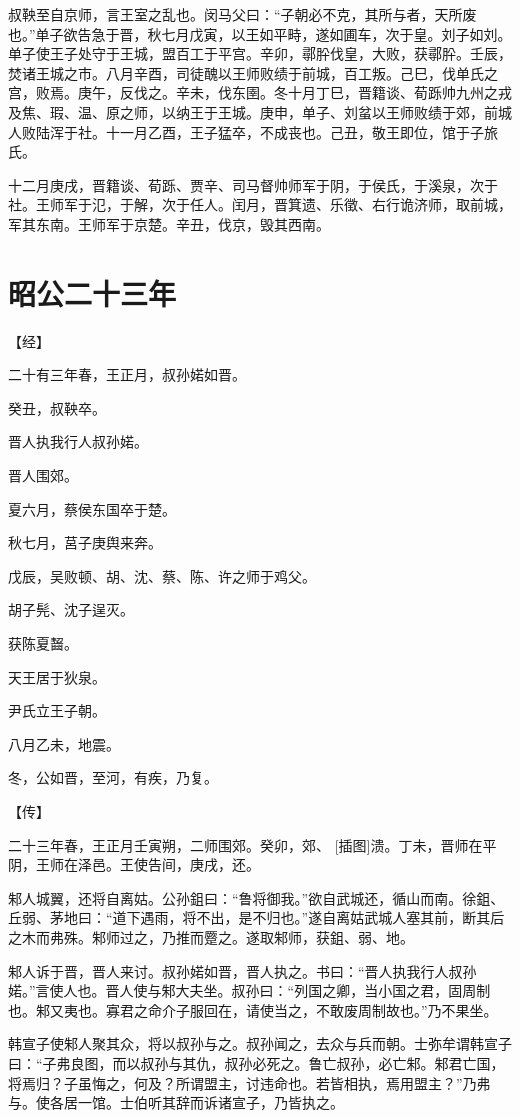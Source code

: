 \documentclass[a4paper,12pt,UTF8,twoside]{ctexbook}
\begin{document}
叔鞅至自京师，言王室之乱也。闵马父曰：“子朝必不克，其所与者，天所废也。”单子欲告急于晋，秋七月戊寅，以王如平畤，遂如圃车，次于皇。刘子如刘。单子使王子处守于王城，盟百工于平宫。辛卯，鄩肸伐皇，大败，获鄩肸。壬辰，焚诸王城之市。八月辛酉，司徒醜以王师败绩于前城，百工叛。己巳，伐单氏之宫，败焉。庚午，反伐之。辛未，伐东圉。冬十月丁巳，晋籍谈、荀跞帅九州之戎及焦、瑕、温、原之师，以纳王于王城。庚申，单子、刘蚠以王师败绩于郊，前城人败陆浑于社。十一月乙酉，王子猛卒，不成丧也。己丑，敬王即位，馆于子旅氏。

十二月庚戌，晋籍谈、荀跞、贾辛、司马督帅师军于阴，于侯氏，于溪泉，次于社。王师军于氾，于解，次于任人。闰月，晋箕遗、乐徵、右行诡济师，取前城，军其东南。王师军于京楚。辛丑，伐京，毁其西南。


\chapter{昭公二十三年}




【经】

二十有三年春，王正月，叔孙婼如晋。

癸丑，叔鞅卒。

晋人执我行人叔孙婼。

晋人围郊。

夏六月，蔡侯东国卒于楚。

秋七月，莒子庚舆来奔。

戊辰，吴败顿、胡、沈、蔡、陈、许之师于鸡父。

胡子髡、沈子逞灭。

获陈夏齧。

天王居于狄泉。

尹氏立王子朝。

八月乙未，地震。

冬，公如晋，至河，有疾，乃复。

【传】

二十三年春，王正月壬寅朔，二师围郊。癸卯，郊、 [插图]溃。丁未，晋师在平阴，王师在泽邑。王使告间，庚戌，还。

邾人城翼，还将自离姑。公孙鉏曰：“鲁将御我。”欲自武城还，循山而南。徐鉏、丘弱、茅地曰：“道下遇雨，将不出，是不归也。”遂自离姑武城人塞其前，断其后之木而弗殊。邾师过之，乃推而蹷之。遂取邾师，获鉏、弱、地。

邾人诉于晋，晋人来讨。叔孙婼如晋，晋人执之。书曰：“晋人执我行人叔孙婼。”言使人也。晋人使与邾大夫坐。叔孙曰：“列国之卿，当小国之君，固周制也。邾又夷也。寡君之命介子服回在，请使当之，不敢废周制故也。”乃不果坐。

韩宣子使邾人聚其众，将以叔孙与之。叔孙闻之，去众与兵而朝。士弥牟谓韩宣子曰：“子弗良图，而以叔孙与其仇，叔孙必死之。鲁亡叔孙，必亡邾。邾君亡国，将焉归？子虽悔之，何及？所谓盟主，讨违命也。若皆相执，焉用盟主？”乃弗与。使各居一馆。士伯听其辞而诉诸宣子，乃皆执之。
\end{document}
